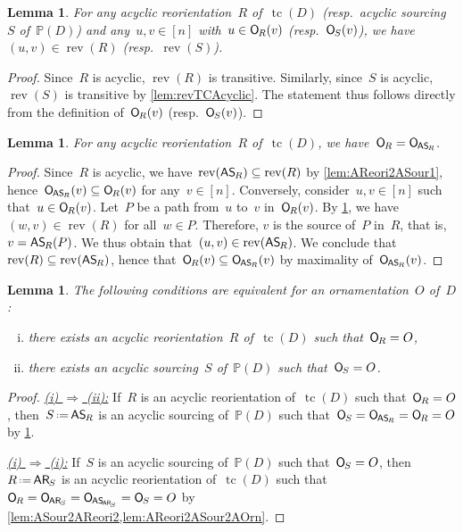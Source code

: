 \documentclass{amsart}
\newtheorem{lemma}[theorem]{Lemma}
\theoremstyle{definition}
\newcommand{\eqdef}{\mbox{\,\raisebox{0.2ex}{\scriptsize\ensuremath{\mathrm:}}\ensuremath{=}\,}} %
\DeclareMathOperator{\tc}{tc} %
\newcommand{\mymap}[2]{\mathsf{#1}_{\hspace{-.7pt}#2}}
\newcommand{\orn}[1]{\mymap{O}{#1}}  %
\newcommand{\areori}[1]{\mymap{AR}{#1}}  %
\DeclareMathOperator{\rev}{rev} %
\newcommand{\asour}[1]{\mymap{AS}{#1}}  %
\newcommand{\PP}{\mathbb P} %
\begin{document}
\begin{lemma}
\label{lem:acyclicSimplifiesDef}
For any acyclic reorientation~$R$ of~$\tc(D)$ (resp.~acyclic sourcing~$S$ of~$\PP(D)$) and any~$u,v \in [n]$ with~$u \in \orn{R}(v)$ (resp.~$\orn{S}(v)$), we have~$(u,v) \in \rev(R)$ (resp.~$\rev(S)$).
\end{lemma}

\begin{proof}
Since~$R$ is acyclic, $\rev(R)$ is transitive.
Similarly, since~$S$ is acyclic, $\rev(S)$ is transitive by \cref{lem:revTCAcyclic}.
The statement thus follows directly from the definition of~$\orn{R}(v)$ (resp.~$\orn{S}(v)$).
\end{proof}

\begin{lemma}
\label{lem:AReori2ASour2AOrn}
For any acyclic reorientation~$R$ of~$\tc(D)$, we have~$\orn{R} = \orn{\asour{R}}$.
\end{lemma}

\begin{proof}
Since~$R$ is acyclic, we have~$\rev(\asour{R}) \subseteq \rev(R)$ by \cref{lem:AReori2ASour1}, hence~$\orn{\asour{R}}(v) \subseteq \orn{R}(v)$ for any~$v \in [n]$.
Conversely, consider~$u,v \in [n]$ such that~$u \in \orn{R}(v)$.
Let~$P$ be a path from~$u$ to~$v$ in~$\orn{R}(v)$.
By \cref{lem:acyclicSimplifiesDef}, we have~$(w,v) \in \rev(R)$ for all~$w \in P$.
Therefore, $v$ is the source of~$P$ in~$R$, that is, $v = \asour{R}(P)$.
We thus obtain that~$(u,v) \in \rev(\asour{R})$.
We conclude that~$\rev(R) \subseteq \rev(\asour{R})$, hence that~$\orn{R}(v) \subseteq \orn{\asour{R}}(v)$ by maximality of~$\orn{\asour{R}}(v)$.
\end{proof}

\begin{lemma}
\label{lem:AOrn2}
The following conditions are equivalent for an ornamentation~$O$ of~$D$:
\begin{enumerate}[(i)]
\item there exists an acyclic reorientation~$R$ of~$\tc(D)$ such that~$\orn{R} = O$,
\item there exists an acyclic sourcing~$S$ of~$\PP(D)$ such that~$\orn{S} = O$.
\end{enumerate}
\end{lemma}

\begin{proof}
\uline{\textsl{(i) $\Rightarrow$ (ii):}}
If~$R$ is an acyclic reorientation of~$\tc(D)$ such that~$\orn{R} = O$, then~$S \eqdef \asour{R}$ is an acyclic sourcing of~$\PP(D)$ such that~$\orn{S} = \orn{\asour{R}} = \orn{R} = O$ by \cref{lem:AReori2ASour2AOrn}.

\medskip\noindent
\uline{\textsl{(i) $\Rightarrow$ (i):}}
If~$S$ is an acyclic sourcing of~$\PP(D)$ such that~$\orn{S} = O$, then~$R \eqdef \areori{S}$ is an acyclic reorientation of~$\tc(D)$ such that~$\orn{R} = \orn{\areori{S}} = \orn{\asour{\areori{S}}} = \orn{S} = O$ by \cref{lem:ASour2AReori2,lem:AReori2ASour2AOrn}.
\end{proof}
\end{document}
